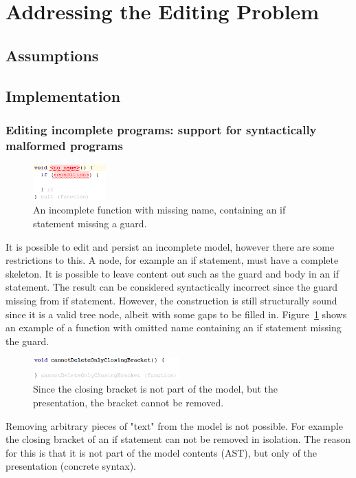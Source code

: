 \documentclass[preprint,numbers,10pt]{sigplanconf}
\begin{document}
\section{Addressing the Editing Problem}

\subsection{Assumptions}

\subsection{Implementation}

\subsubsection{Editing incomplete programs: support for syntactically malformed programs}
\begin{figure}[H]
	\centering
	\includegraphics[width=0.25\textwidth]{screens/IncompleteNode.png}
	\caption{An incomplete function with missing name, containing an if statement missing a guard.}
	\label{fig:IncompleteNode}
\end{figure}

It is possible to edit and persist an incomplete model, however there are some restrictions to this. A node, for example an if statement, must have a complete skeleton. It is possible to leave content out such as the guard and body in an if statement. The result can be considered syntactically incorrect since the guard missing from if statement. However, the construction is still structurally sound since it is a valid tree node, albeit with some gaps to be filled in. Figure~\ref{fig:IncompleteNode} shows an example of a function with omitted name containing an if statement missing the guard.

\begin{figure}[H]
	\centering
	\includegraphics[width=0.50\textwidth]{screens/CannotDeleteConcreteSyntaxElements.png}
	\caption{Since the closing bracket is not part of the model, but the presentation, the bracket cannot be removed.}
	\label{fig:CannotDeleteConcreteSyntaxElements}
\end{figure}
Removing arbitrary pieces of "text" from the model is not possible. For example the closing bracket of an if statement can not be removed in isolation. The reason for this is that it is not part of the model contents (AST), but only of the presentation (concrete syntax).
\end{document}

